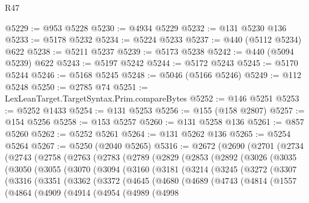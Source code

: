 \begin{lexlean}{R47}
\begin{coremodule}
@5229 := @953 @5228
@5230 := @4934 @5229
@5232 := @131 @5230 @136
@5233 := @5178 @5232
@5234 := @5224 @5233
@5237 := @440 (@5112 @5234) @622
@5238 := @5211 @5237
@5239 := @5173 @5238
@5242 := @440 (@5094 @5239) @622
@5243 := @5197 @5242
@5244 := @5172 @5243
@5245 := @5170 @5244
@5246 := @5168 @5245
@5248 := @5046 (@5166 @5246)
@5249 := @112 @5248
@5250 := @2785 @74
@5251 := LexLeanTarget.TargetSyntax.Prim.compareBytes
@5252 := @146 @5251
@5253 := @5252 @1433
@5254 := @131 @5253
@5256 := @155 (@158 @2807)
@5257 := @154 @5256
@5258 := @153 @5257
@5260 := @131 @5258 @136
@5261 := @857 @5260
@5262 := @5252 @5261
@5264 := @131 @5262 @136
@5265 := @5254 @5264
@5267 := @5250 (@2040 @5265)
@5316 := @2672
    (@2690
      (@2701
        (@2734
          (@2743
            (@2758
              (@2763
                (@2783
                  (@2789
                    (@2829
                      (@2853
                        (@2892
                          (@3026
                            (@3035
                              (@3050
                                (@3055
                                  (@3070
                                    (@3094
                                      (@3160
                                        (@3181
                                          (@3214
                                            (@3245
                                              (@3272
                                                (@3307
                                                  (@3316
                                                    (@3351
                                                      (@3362
                                                        (@3372
                                                          (@4645
                                                            (@4680
                                                              (@4689
                                                                (@4743
                                                                  (@4814
                                                                    (@1557
                                                                      (@4864
                                                                        (@4909
                                                                          (@4914
                                                                            (@4954
                                                                              (@4989
                                                                                (@4998

\end{coremodule}
\end{lexlean}
